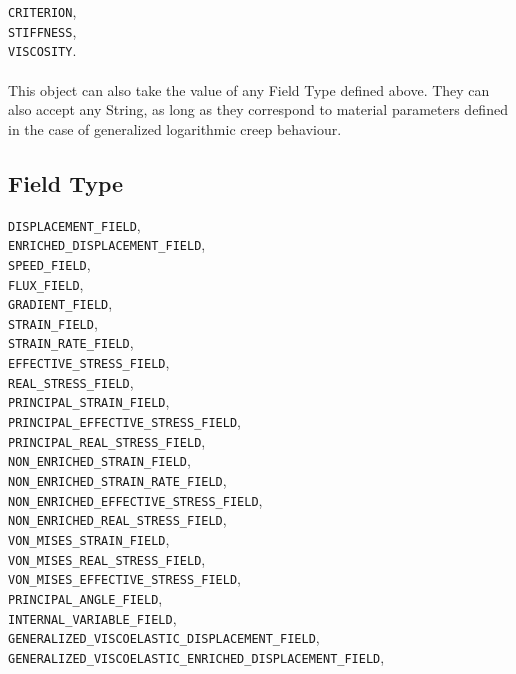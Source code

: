 \documentclass[10pt]{article}
\begin{document}
    \verb+CRITERION+,\\
    \verb+STIFFNESS+,\\
    \verb+VISCOSITY+.
    
\paragraph{} This object can also take the value of any Field Type defined above. They can also accept any String, as long as they correspond to material parameters defined in the case of generalized logarithmic creep behaviour.


\subsection{Field Type}

    \verb+DISPLACEMENT_FIELD+,\\
    \verb+ENRICHED_DISPLACEMENT_FIELD+,\\
    \verb+SPEED_FIELD+,\\
    \verb+FLUX_FIELD+,\\
    \verb+GRADIENT_FIELD+,\\
    \verb+STRAIN_FIELD+,\\
    \verb+STRAIN_RATE_FIELD+,\\
    \verb+EFFECTIVE_STRESS_FIELD+,\\
    \verb+REAL_STRESS_FIELD+,\\
    \verb+PRINCIPAL_STRAIN_FIELD+,\\
    \verb+PRINCIPAL_EFFECTIVE_STRESS_FIELD+,\\
    \verb+PRINCIPAL_REAL_STRESS_FIELD+,\\
    \verb+NON_ENRICHED_STRAIN_FIELD+,\\
    \verb+NON_ENRICHED_STRAIN_RATE_FIELD+,\\
    \verb+NON_ENRICHED_EFFECTIVE_STRESS_FIELD+,\\
    \verb+NON_ENRICHED_REAL_STRESS_FIELD+,\\
    \verb+VON_MISES_STRAIN_FIELD+,\\
    \verb+VON_MISES_REAL_STRESS_FIELD+,\\
    \verb+VON_MISES_EFFECTIVE_STRESS_FIELD+,\\
    \verb+PRINCIPAL_ANGLE_FIELD+,\\
    \verb+INTERNAL_VARIABLE_FIELD+,\\
    \verb+GENERALIZED_VISCOELASTIC_DISPLACEMENT_FIELD+,\\
    \verb+GENERALIZED_VISCOELASTIC_ENRICHED_DISPLACEMENT_FIELD+,\\
\end{document}
